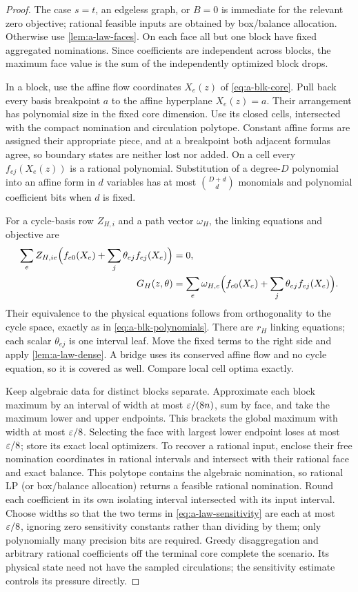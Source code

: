 \begin{proof}
The case $s=t$, an edgeless graph, or $B=0$ is immediate for the relevant
zero objective; rational feasible inputs are obtained by box/balance
allocation. Otherwise use \cref{lem:a-law-faces}. On each face all but
one block have fixed aggregated nominations. Since coefficients are
independent across blocks, the maximum face value is the sum of the
independently optimized block drops.

In a block, use the affine flow coordinates $X_e(z)$ of
\cref{eq:a-blk-core}. Pull back every basis breakpoint $a$ to the
affine hyperplane $X_e(z)=a$. Their arrangement has polynomial size in
the fixed core dimension. Use its closed cells, intersected with the
compact nomination and circulation polytope. Constant affine forms
are assigned their appropriate piece, and at a breakpoint both adjacent
formulas agree, so boundary states are neither lost nor added.
On a cell every $f_{ej}(X_e(z))$ is a rational polynomial. Substitution
of a degree-$D$ polynomial into an affine form in $d$ variables has at
most $\binom{D+d}{d}$ monomials and polynomial coefficient bits when
$d$ is fixed.

For a cycle-basis row $Z_{H,i}$ and a path vector $\omega_H$, the
linking equations and objective are
\begin{align*}
 \sum_e Z_{H,ie}\Bigl(f_{e0}(X_e)
               +\sum_j\theta_{ej}f_{ej}(X_e)\Bigr)&=0,\\
 G_H(z,\theta)&=\sum_e\omega_{H,e}\Bigl(f_{e0}(X_e)
               +\sum_j\theta_{ej}f_{ej}(X_e)\Bigr).
\end{align*}
Their equivalence to the physical equations follows from orthogonality
to the cycle space, exactly as in \cref{eq:a-blk-polynomials}.
There are $r_H$ linking equations; each scalar $\theta_{ej}$ is one
interval leaf. Move the fixed terms to the right side and apply
\cref{lem:a-law-dense}. A bridge uses its conserved affine flow and no
cycle equation, so it is covered as well. Compare local cell optima exactly.

Keep algebraic data for distinct blocks separate. Approximate each
block maximum by an interval of width at most $\varepsilon/(8n)$, sum by face,
and take the maximum lower and upper endpoints. This brackets the global
maximum with width at most $\varepsilon/8$. Selecting the face with largest
lower endpoint loses at most $\varepsilon/8$; store its exact local optimizers.
To recover a rational input, enclose their free nomination coordinates
in rational intervals and intersect with their rational face and exact
balance. This polytope contains the algebraic nomination, so rational
LP (or box/balance allocation) returns a feasible rational nomination.
Round each coefficient in its own isolating interval intersected with
its input interval. Choose widths so that the two terms in
\cref{eq:a-law-sensitivity} are each at most $\varepsilon/8$, ignoring zero
sensitivity constants rather than dividing by them; only polynomially
many precision bits are required. Greedy disaggregation and arbitrary
rational coefficients off the terminal core complete the scenario.
Its physical state need not have the sampled circulations; the
sensitivity estimate controls its pressure directly.


\end{proof}
